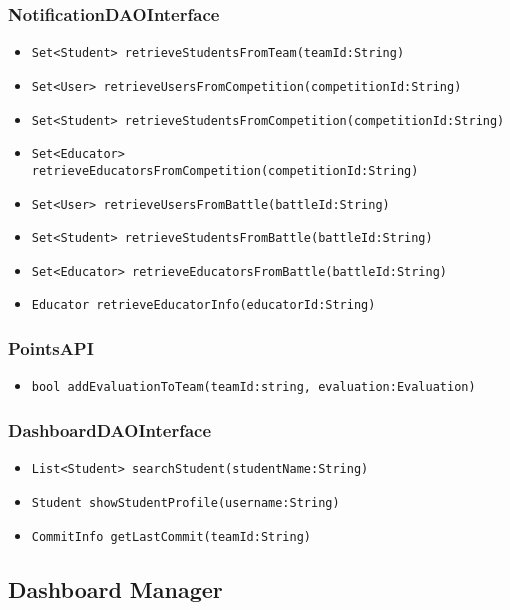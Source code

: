 \subsubsection{NotificationDAOInterface}
\begin{itemize}
    \item \texttt{Set<Student> retrieveStudentsFromTeam(teamId:String)}
    \item \texttt{Set<User> retrieveUsersFromCompetition(competitionId:String)}
    \item \texttt{Set<Student> retrieveStudentsFromCompetition(competitionId:String)}%
    \item \texttt{Set<Educator> retrieveEducatorsFromCompetition(competitionId:String)}
    \item \texttt{Set<User> retrieveUsersFromBattle(battleId:String)}
    \item \texttt{Set<Student> retrieveStudentsFromBattle(battleId:String)}
    \item \texttt{Set<Educator> retrieveEducatorsFromBattle(battleId:String)}
    \item \texttt{Educator retrieveEducatorInfo(educatorId:String)}%
\end{itemize}

\subsubsection{PointsAPI}
\begin{itemize}
    \item \texttt{bool addEvaluationToTeam(teamId:string, evaluation:Evaluation)}
\end{itemize}

\subsubsection{DashboardDAOInterface}
\begin{itemize}
    \item \texttt{List<Student> searchStudent(studentName:String)}%
    \item \texttt{Student showStudentProfile(username:String)}%
    \item \texttt{CommitInfo getLastCommit(teamId:String)}%
\end{itemize}

\subsection{Dashboard Manager}
